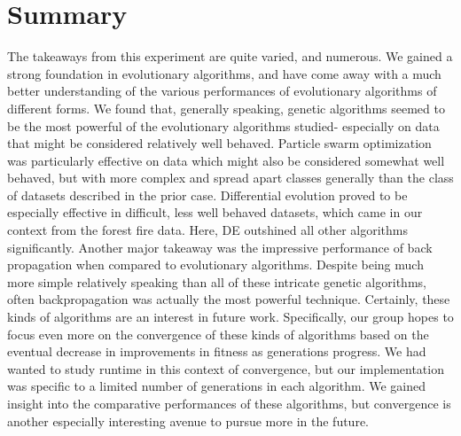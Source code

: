 \documentclass[twoside,11pt]{article}
\begin{document}
\section{Summary}
The takeaways from this experiment are quite varied, and numerous. We gained a strong foundation
in evolutionary algorithms, and have come away with a much better understanding of the various
performances of evolutionary algorithms of different forms. We found that, generally speaking, 
genetic algorithms seemed to be the most powerful of the evolutionary algorithms studied- 
especially on data that might be considered relatively well behaved. Particle swarm optimization was
particularly effective on data which might also be considered somewhat well behaved, but with more
complex and spread apart classes generally than the class of datasets described in the prior case.
Differential evolution proved to be especially effective in difficult, less well behaved datasets,
which came in our context from the forest fire data. Here, DE outshined all other algorithms significantly.
Another major takeaway was the impressive performance of back propagation when compared to evolutionary
algorithms. Despite being much more simple relatively speaking than all of these intricate genetic algorithms,
often backpropagation was actually the most powerful technique. Certainly, these kinds of algorithms are an
interest in future work. Specifically, our group hopes to focus even more on the convergence of these kinds of
algorithms based on the eventual decrease in improvements in fitness as generations progress. We had wanted to
study runtime in this context of convergence, but our implementation was specific to a limited number of generations
in each algorithm. We gained insight into the comparative performances of these algorithms, but convergence is another
especially interesting avenue to pursue more in the future.
\end{document}
